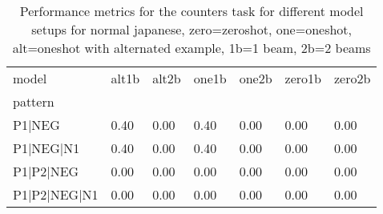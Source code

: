 \begin{table}[h]
\begin{tabular}{l|llllll}
\toprule
model & alt1b & alt2b & one1b & one2b & zero1b & zero2b \\
pattern &  &  &  &  &  &  \\
\midrule
P1|NEG & 0.40 & 0.00 & 0.40 & 0.00 & 0.00 & 0.00 \\
P1|NEG|N1 & 0.40 & 0.00 & 0.40 & 0.00 & 0.00 & 0.00 \\
P1|P2|NEG & 0.00 & 0.00 & 0.00 & 0.00 & 0.00 & 0.00 \\
P1|P2|NEG|N1 & 0.00 & 0.00 & 0.00 & 0.00 & 0.00 & 0.00 \\
\bottomrule
\end{tabular}
\caption{Performance metrics for the counters task for different model setups for normal japanese, zero=zeroshot, one=oneshot, alt=oneshot with alternated example, 1b=1 beam, 2b=2 beams}
\label{tab:ja norm_counters_performance}
\end{table}
